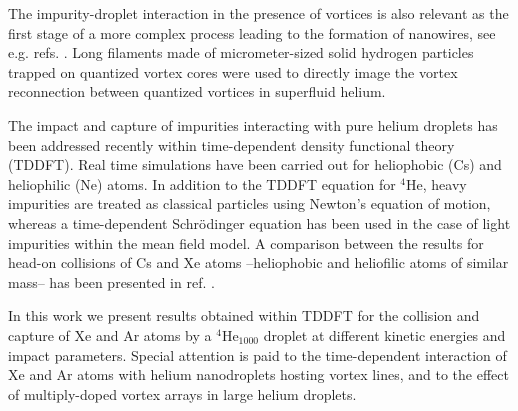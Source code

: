 The impurity-droplet interaction in the presence of vortices 
is also relevant as the first stage of a more complex process
leading to the 
formation of nanowires, see e.g. refs. \cite{Leb11,Gom12,Lat14,Tha14}.
Long filaments made of micrometer-sized solid hydrogen 
particles trapped on quantized vortex cores
were used to directly image the vortex reconnection
between quantized vortices in superfluid helium.\cite{Bew08}


The impact and capture of impurities  
interacting with pure helium droplets has been addressed recently within time-dependent 
density functional theory (TDDFT).
Real time simulations have been carried out for 
heliophobic\cite{Lea14a} (Cs) and heliophilic\cite{Vil16b} (Ne) atoms. In addition to the 
TDDFT equation for $^4$He, heavy impurities are treated as 
classical particles using
Newton's equation of motion, whereas a time-dependent 
Schr\"odinger equation has been used in the case of  
light impurities within the mean field model.\cite{Her12a,Vil16b}  
A comparison between the results for head-on collisions of Cs and Xe 
atoms --heliophobic and heliofilic atoms of similar mass-- has been presented in ref. \cite{Cop16}.

In this work we present results obtained within TDDFT 
for the collision and capture of Xe and Ar atoms by a $^4$He$_{1000}$ 
droplet at different kinetic energies and impact parameters. Special attention is paid 
to the  time-dependent interaction of Xe and Ar atoms with 
helium nanodroplets hosting 
vortex lines, and to the effect of multiply-doped vortex arrays in large helium droplets.

